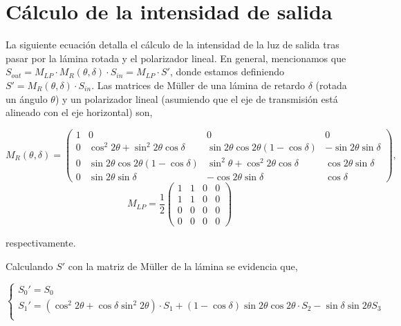 \documentclass[11pt,a4paper]{article}
\begin{document}
\appendix

\section{Cálculo de la intensidad de salida}\label{apendice: cuenta_intensidad}
La siguiente ecuación detalla el cálculo de la intensidad de la luz de salida tras pasar por la lámina rotada y el polarizador lineal. En general, mencionamos que $S_{out} = M_{LP} \cdot M_{R}(\theta,\delta) \cdot S_{in} = M_{LP} \cdot S'$, donde estamos definiendo $S' = M_{R}(\theta,\delta) \cdot S_{in}$. Las matrices de Müller de una lámina de retardo $\delta$ (rotada un ángulo $\theta$) y un polarizador lineal (asumiendo que el eje de transmisión está alineado con el eje horizontal) son, 

\begin{equation*}
M_{R}(\theta,\delta) = \begin{pmatrix}
1 & 0 & 0 & 0 \\
0 & \cos^2 2\theta + \sin^2 2\theta \cos \delta & \sin 2\theta \cos 2\theta(1-\cos \delta) & -\sin2\theta \sin \delta \\
0 & \sin2\theta \cos2\theta(1-\cos \delta) & \sin^2\theta + \cos^2 2\theta \cos \delta& \cos 2\theta \sin \delta \\
0 & \sin2\theta \sin \delta & -\cos2\theta \sin \delta & \cos \delta
\end{pmatrix}, 
\end{equation*}
\begin{equation*}
M_{LP} = \frac{1}{2}\begin{pmatrix}
1 & 1 & 0 & 0 \\
1 & 1 & 0 & 0 \\
0 & 0 & 0 & 0 \\
0 & 0 & 0 & 0
\end{pmatrix}
\end{equation*}

respectivamente.

Calculando $S'$ con la matriz de Müller de la lámina se evidencia que, 

\begin{equation*}
\begin{cases}
    S_0' = S_0 \\
    S_1' = (\cos^2 2\theta + \cos \delta \sin^2 2\theta) \cdot S_1 +(1 - \cos \delta) \sin 2\theta \cos 2\theta \cdot S_2 - \sin \delta \sin 2\theta S_3 \\
\end{cases}
\end{equation*}
\end{document}
